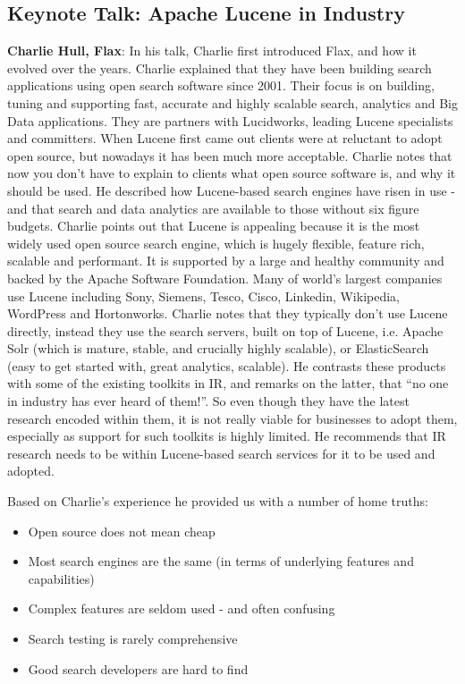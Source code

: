 \subsection*{Keynote Talk: Apache Lucene in Industry} 
{\bf Charlie Hull, Flax}: In his talk, Charlie first introduced Flax, and how it evolved over the years. Charlie explained that they have been building search applications using open search software since 2001. Their focus is on building, tuning and supporting fast, accurate and highly scalable search, analytics and Big Data applications. They are partners with Lucidworks, leading Lucene specialists and committers. When Lucene first came out clients were at reluctant to adopt open source, but nowadays it has been much more acceptable. Charlie notes that now you don't have to explain to clients what open source software is, and why it should be used. He described how Lucene-based search engines have risen in use - and that search and data analytics are available to those without six figure budgets. Charlie points out that Lucene is appealing because it is the most widely used open source search engine, which is hugely flexible, feature rich, scalable and performant. It is supported by a large and healthy community and backed by the Apache Software Foundation. Many of world's largest companies use Lucene including Sony, Siemens, Tesco, Cisco, Linkedin, Wikipedia, WordPress and Hortonworks. Charlie notes that they typically don't use Lucene directly, instead they use the search servers, built on top of Lucene, i.e. Apache Solr (which is mature, stable, and crucially highly scalable), or ElasticSearch (easy to get started with, great analytics, scalable). He contrasts these products with some of the existing toolkits in IR, and remarks on the latter, that ``no one in industry has ever heard of them!''. So even though they have the latest research encoded within them, it is not really viable for businesses to adopt them, especially as support for such toolkits is highly limited. He recommends that IR research needs to be within Lucene-based search services for it to be used and adopted. 


Based on Charlie's experience he provided us with a number of home truths:
\begin{itemize}
	\item Open source does not mean cheap 
	\item Most search engines are the same (in terms of underlying features and capabilities)
	\item Complex features are seldom used - and often confusing
	\item Search testing is rarely comprehensive
	\item Good search developers are hard to find
\end{itemize}


